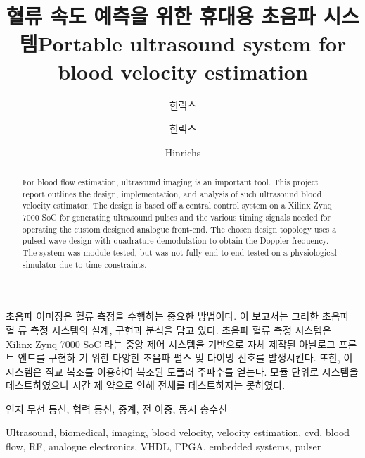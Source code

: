 \documentclass[master,english,final,hidelinks]{kaist-ucs}
\title[korean] {혈류 속도 예측을 위한 휴대용 초음파 시스템}
\title[english]{Portable ultrasound system for blood velocity estimation}
\author[korean]{힌릭스}{예페}
\author[korean2]{힌릭스}{예페}   %
\author[chinese]{}{}
\author[english]{Hinrichs}{Jeppe}
\begin{document}

	\thesisinfo
	\begin{summary}
		초음파 이미징은 혈류 측정을 수행하는 중요한 방법이다. 이 보고서는 그러한 초음파 혈 류 측정 시스템의 설계, 구현과 분석을 담고 있다. 초음파 혈류 측정 시스템은 Xilinx Zynq	7000 SoC 라는 중앙 제어 시스템을 기반으로 자체 제작된 아날로그 프론트 엔드를 구현하	기 위한 다양한 초음파 펄스 및 타이밍 신호를 발생시킨다. 또한, 이 시스템은 직교 복조를 이용하여 복조된 도플러 주파수를 얻는다. 모듈 단위로 시스템을 테스트하였으나 시간 제 약으로 인해 전체를 테스트하지는 못하였다.
	\end{summary}

	\begin{Korkeyword}
		인지 무선 통신, 협력 통신, 중계, 전 이중, 동시 송수신
	\end{Korkeyword}


	\begin{abstract}
		For blood flow estimation, ultrasound imaging is an important tool. This project report outlines the design, implementation, and analysis of such ultrasound blood velocity estimator. The design is based off a central control system on a Xilinx Zynq 7000 SoC for generating ultrasound pulses and the various timing signals needed for operating the custom designed analogue front-end. The chosen design topology uses a pulsed-wave design with quadrature demodulation to obtain the Doppler frequency. The system was module tested, but was not fully end-to-end tested on a physiological simulator due to time constraints.
	\end{abstract}

	\begin{Engkeyword}
		Ultrasound, biomedical, imaging, blood velocity, velocity estimation, cvd, blood flow, RF, analogue electronics, VHDL, FPGA, embedded systems, pulser
	\end{Engkeyword}


	\addtocounter{pagemarker}{1}                 %
	\newpage
\end{document}
